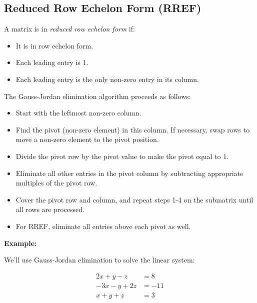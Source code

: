\subsection{Reduced Row Echelon Form (RREF)}

A matrix is in \emph{reduced row echelon form} if:

\begin{itemize}

    \item It is in row echelon form.

    \item Each leading entry is 1.

    \item Each leading entry is the only non-zero entry in its column.

\end{itemize}

The Gauss-Jordan elimination algorithm proceeds as follows:

\begin{itemize}

    \item Start with the leftmost non-zero column.

    \item Find the pivot (non-zero element) in this column. If necessary, swap rows to move a non-zero element to the pivot position.

    \item Divide the pivot row by the pivot value to make the pivot equal to 1.

    \item Eliminate all other entries in the pivot column by subtracting appropriate multiples of the pivot row.

    \item Cover the pivot row and column, and repeat steps 1-4 on the submatrix until all rows are processed.

    \item For RREF, eliminate all entries above each pivot as well.

\end{itemize}

\textbf{Example:}

We'll use Gauss-Jordan elimination to solve the linear system:

\begin{align*}
    2x + y - z   & = 8   \\
    -3x - y + 2z & = -11 \\
    x + y + z    & = 3
\end{align*}

